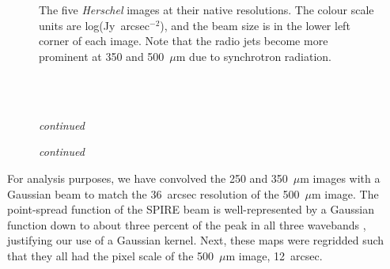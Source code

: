 \begin{figure}[!htbp]
\\
\\
\caption[\emph{Herschel} photometric maps of Centaurus~A a their native resolution]{The five \emph{Herschel} images at their native resolutions.  The colour scale units are log(Jy~arcsec$^{-2}$), and the beam size is in the lower left corner of each image.  Note that the radio jets become more prominent at 350 and 500~$\mu$m due to synchrotron radiation.}
\label{fig:Herschel_maps2}
\end{figure}
\begin{figure}[!htbp]
\ContinuedFloat
{}\\
\\
\caption[]{\emph{continued}}
\end{figure}
\begin{figure}[!htbp]
\ContinuedFloat
{}
\caption[]{\emph{continued}}
\end{figure}

For analysis purposes, we have convolved the 250 and 350~$\mu$m images with a Gaussian beam to match the 36~arcsec resolution of the 500~$\mu$m image.  The point-spread function of the SPIRE beam is well-represented by a Gaussian function down to about three percent of the peak in all three wavebands \citep{2010A&A...518L...3G}, justifying our use of a Gaussian kernel.  Next, these maps were regridded such that they all had the pixel scale of the 500~$\mu$m image, 12~arcsec.

